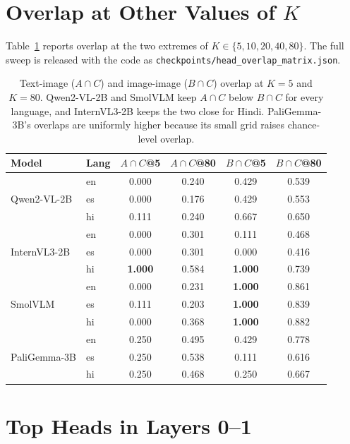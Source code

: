 \documentclass[10pt]{article}
\newcommand{\AcapC}{A{\cap}C}
\newcommand{\BcapC}{B{\cap}C}
\begin{document}
\section{Overlap at Other Values of \texorpdfstring{$K$}{K}}
\label{app:ksweep}

Table~\ref{tab:ksweep} reports overlap at the two extremes of $K \in \{5, 10, 20, 40, 80\}$. The full sweep is released with the code as \texttt{checkpoints/head\_overlap\_matrix.json}.

\begin{table}[H]
\centering
\caption{Text-image ($\AcapC$) and image-image ($\BcapC$) overlap at $K{=}5$ and $K{=}80$. Qwen2-VL-2B and SmolVLM keep $\AcapC$ below $\BcapC$ for every language, and InternVL3-2B keeps the two close for Hindi. PaliGemma-3B's overlaps are uniformly higher because its small grid raises chance-level overlap.}
\label{tab:ksweep}
\begin{tabular}{ll cccc}
\toprule
Model & Lang & $\AcapC$@5 & $\AcapC$@80 & $\BcapC$@5 & $\BcapC$@80 \\
\midrule
\multirow{3}{*}{Qwen2-VL-2B}
  & en & 0.000 & 0.240 & 0.429 & 0.539 \\
  & es & 0.000 & 0.176 & 0.429 & 0.553 \\
  & hi & 0.111 & 0.240 & 0.667 & 0.650 \\
\midrule
\multirow{3}{*}{InternVL3-2B}
  & en & 0.000 & 0.301 & 0.111 & 0.468 \\
  & es & 0.000 & 0.301 & 0.000 & 0.416 \\
  & hi & \textbf{1.000} & 0.584 & \textbf{1.000} & 0.739 \\
\midrule
\multirow{3}{*}{SmolVLM}
  & en & 0.000 & 0.231 & \textbf{1.000} & 0.861 \\
  & es & 0.111 & 0.203 & \textbf{1.000} & 0.839 \\
  & hi & 0.000 & 0.368 & \textbf{1.000} & 0.882 \\
\midrule
\multirow{3}{*}{PaliGemma-3B}
  & en & 0.250 & 0.495 & 0.429 & 0.778 \\
  & es & 0.250 & 0.538 & 0.111 & 0.616 \\
  & hi & 0.250 & 0.468 & 0.250 & 0.667 \\
\bottomrule
\end{tabular}
\end{table}

\section{Top Heads in Layers 0--1}
\label{app:layers}
\end{document}
